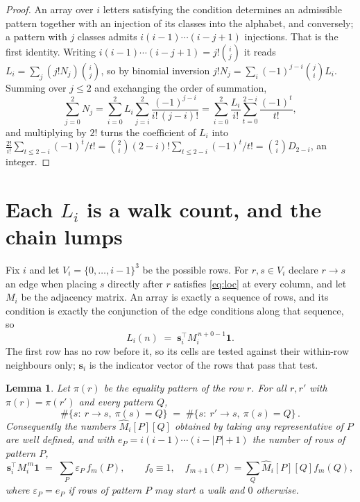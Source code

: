 \documentclass[11pt,a4paper]{article}
\theoremstyle{plain}
\newtheorem{lemma}[theorem]{Lemma}
\theoremstyle{definition}
\begin{document}
\begin{proof}
An array over $i$ letters satisfying the condition determines an admissible pattern together
with an injection of its classes into the alphabet, and conversely; a pattern with $j$
classes admits $i(i-1)\cdots(i-j+1)$ injections. That is the first identity. Writing
$i(i-1)\cdots(i-j+1)=j!\binom{i}{j}$ it reads $L_i=\sum_j (j!N_j)\binom{i}{j}$, so by
binomial inversion $j!N_j=\sum_{i}(-1)^{j-i}\binom{j}{i}L_i$. Summing over
$j\le 2$ and exchanging the order of summation,
\[
\sum_{j=0}^{2}N_j=\sum_{i=0}^{2}L_i\sum_{j=i}^{2}\frac{(-1)^{j-i}}{i!\,(j-i)!}
=\sum_{i=0}^{2}\frac{L_i}{i!}\sum_{t=0}^{2-i}\frac{(-1)^t}{t!} ,
\]
and multiplying by $2!$ turns the coefficient of $L_i$ into
$\frac{2!}{i!}\sum_{t\le 2-i}(-1)^t/t!=\binom{2}{i}(2-i)!\sum_{t\le 2-i}(-1)^t/t!
=\binom{2}{i}D_{2-i}$, an integer.
\end{proof}

\section{Each $L_i$ is a walk count, and the chain lumps}

Fix $i$ and let $V_i=\{0,\dots,i-1\}^{3}$ be the possible rows. For $r,s\in V_i$
declare $r\to s$ an edge when placing $s$ directly after $r$ satisfies \eqref{eq:loc} at
every column, and let $M_i$ be the adjacency matrix. An array is exactly a sequence of
rows, and its condition is exactly the conjunction of the edge conditions along that
sequence, so
\[
L_i(n)\;=\;\mathbf{s}_i^{\!\top}M_i^{\,n+0-1}\mathbf{1} .
\]
The first row has no row before it, so its cells are tested
against their within-row neighbours only; $\mathbf{s}_i$ is the indicator vector of the
rows that pass that test.

\begin{lemma}\label{lem:lump}
Let $\pi(r)$ be the equality pattern of the row $r$. For all $r,r'$ with
$\pi(r)=\pi(r')$ and every pattern $Q$,
\[
\#\{s:\ r\to s,\ \pi(s)=Q\}\;=\;\#\{s:\ r'\to s,\ \pi(s)=Q\}\, .
\]
Consequently the numbers $\widehat M_i[P][Q]$ obtained by taking any representative of $P$
are well defined, and with $e_P=i(i-1)\cdots(i-|P|+1)$ the number of rows of pattern $P$,
\[
\mathbf{s}_i^{\!\top}M_i^{\,m}\mathbf{1}\;=\;\sum_P \varepsilon_P\,f_m(P),
\qquad f_0\equiv1,\quad f_{m+1}(P)=\sum_Q\widehat M_i[P][Q]f_m(Q),
\]
where $\varepsilon_P=e_P$ if rows of pattern $P$ may start a walk and $0$ otherwise.
\end{lemma}
\end{document}
